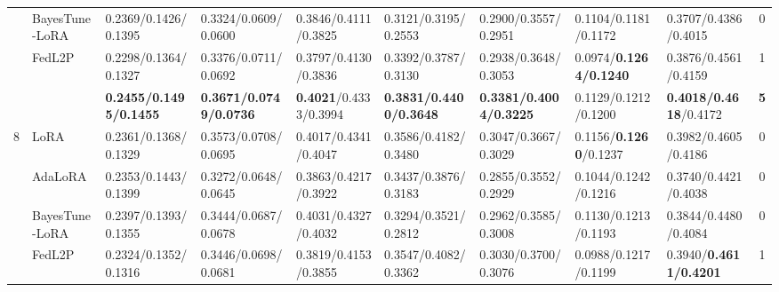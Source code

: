 \begin{table*}[t]
\begin{scriptsize}
{\begin{tabular}{c|l|l|l|l|l|l|l|l|c}
                    & BayesTune-LoRA                            & 0.2369/0.1426/0.1395             & 0.3324/0.0609/0.0600               & 0.3846/0.4111/0.3825             & 0.3121/0.3195/0.2553             & 0.2900/0.3557/0.2951               & 0.1104/0.1181/0.1172             & 0.3707/0.4386/0.4015                                         & 0             \\ %
                    & FedL2P                               & 0.2298/0.1364/0.1327             & 0.3376/0.0711/0.0692             & 0.3797/0.4130/0.3836              & 0.3392/0.3787/0.3130              & 0.2938/0.3648/0.3053             & 0.0974/\textbf{0.1264/0.1240}              & 0.3876/0.4561/0.4159                                         & 1             \\ %
                    & \method{}                                 & \textbf{0.2455/0.1495/0.1455}    & \textbf{0.3671/0.0749/0.0736}    & \textbf{0.4021}/0.4333/0.3994    & \textbf{0.3831/0.4400/0.3648}      & \textbf{0.3381/0.4004/0.3225}    & 0.1129/0.1212/0.1200               & \textbf{0.4018/0.4618}/0.4172                                & \textbf{5}    \\ \hline
\multirow{5}{*}{8}  & LoRA                                   & 0.2361/0.1368/0.1329             & 0.3573/0.0708/0.0695             & 0.4017/0.4341/0.4047             & 0.3586/0.4182/0.3480              & 0.3047/0.3667/0.3029             & 0.1156/\textbf{0.1260}/0.1237              & 0.3982/0.4605/0.4186                                         & 0             \\ %
                    & AdaLoRA                              & 0.2353/0.1443/0.1399             & 0.3272/0.0648/0.0645             & 0.3863/0.4217/0.3922             & 0.3437/0.3876/0.3183             & 0.2855/0.3552/0.2929             & 0.1044/0.1242/0.1216             & 0.3740/0.4421/0.4038                                          & 0             \\ %
                    & BayesTune-LoRA                            & 0.2397/0.1393/0.1355             & 0.3444/0.0687/0.0678             & 0.4031/0.4327/0.4032             & 0.3294/0.3521/0.2812             & 0.2962/0.3585/0.3008             & 0.1130/0.1213/0.1193              & 0.3844/0.4480/0.4084                                          & 0             \\ %
                    & FedL2P                               & 0.2324/0.1352/0.1316             & 0.3446/0.0698/0.0681             & 0.3819/0.4153/0.3855             & 0.3547/0.4082/0.3362             & 0.3030/0.3700/0.3076                & 0.0988/0.1217/0.1199             & 0.3940/\textbf{0.4611/0.4201}                                          & 1             \\ %

\end{tabular}}
\end{scriptsize}
\end{table*}
